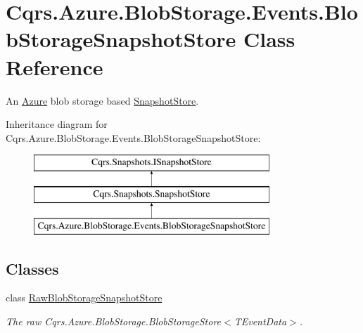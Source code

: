 \hypertarget{classCqrs_1_1Azure_1_1BlobStorage_1_1Events_1_1BlobStorageSnapshotStore}{}\section{Cqrs.\+Azure.\+Blob\+Storage.\+Events.\+Blob\+Storage\+Snapshot\+Store Class Reference}
\label{classCqrs_1_1Azure_1_1BlobStorage_1_1Events_1_1BlobStorageSnapshotStore}


An \hyperlink{namespaceCqrs_1_1Azure}{Azure} blob storage based \hyperlink{classCqrs_1_1Snapshots_1_1SnapshotStore_aa8ab186f864443c7d9647a4522864a84_aa8ab186f864443c7d9647a4522864a84}{Snapshot\+Store}.  


Inheritance diagram for Cqrs.\+Azure.\+Blob\+Storage.\+Events.\+Blob\+Storage\+Snapshot\+Store\+:\begin{figure}[H]
\begin{center}
\leavevmode
\includegraphics[height=3.000000cm]{classCqrs_1_1Azure_1_1BlobStorage_1_1Events_1_1BlobStorageSnapshotStore}
\end{center}
\end{figure}
\subsection*{Classes}
\begin{DoxyCompactItemize}
\item 
class \hyperlink{classCqrs_1_1Azure_1_1BlobStorage_1_1Events_1_1BlobStorageSnapshotStore_1_1RawBlobStorageSnapshotStore}{Raw\+Blob\+Storage\+Snapshot\+Store}
\begin{DoxyCompactList}\small\item\em The raw Cqrs.\+Azure.\+Blob\+Storage.\+Blob\+Storage\+Store$<$\+T\+Event\+Data$>$. \end{DoxyCompactList}\end{DoxyCompactItemize}
